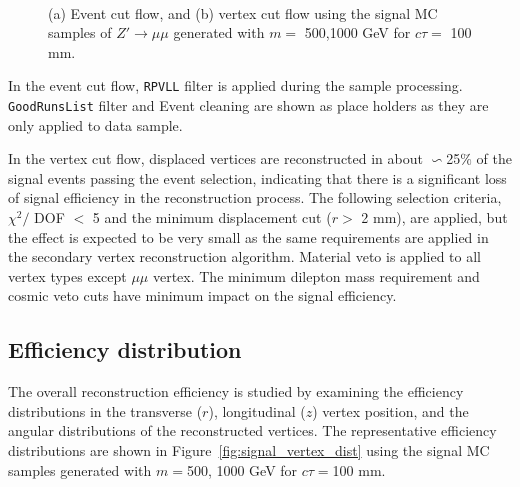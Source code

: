 \begin{figure}[!htb]
    \centering
     \\
    \caption{(a) Event cut flow, and (b) vertex cut flow using the signal MC samples of $Z'\rightarrow \mu\mu$ generated with $m =$ 500,1000 GeV for $c\tau= $ 100 mm.}
    \label{fig:signal_cutflow_MC_mumu}
\end{figure}

In the event cut flow, \texttt{RPVLL} filter is applied during the sample processing. \texttt{GoodRunsList} filter and Event cleaning are shown as place holders as they are only applied to data sample.

In the vertex cut flow, displaced vertices are reconstructed in about $\backsim$25$\%$ of the signal events passing the event selection, indicating that there is a significant loss of signal efficiency in the reconstruction process. The following selection criteria, $\chi^{2} /$ DOF $<$ 5 and the minimum displacement cut ($r > $ 2 mm), are applied, but the effect is expected to be very small as the same requirements are applied in the secondary vertex reconstruction algorithm. Material veto is applied to all vertex types except $\mu\mu$ vertex. The minimum dilepton mass requirement and cosmic veto cuts have minimum impact on the signal efficiency.

\subsection{Efficiency distribution}
\label{sec:signal_vertex_distribution}
The overall reconstruction efficiency is studied by examining the efficiency distributions in the transverse ($r$), longitudinal ($z$) vertex position, and the angular distributions of the reconstructed vertices. The representative efficiency distributions are shown in Figure~\ref{fig:signal_vertex_dist} using the signal MC samples generated with $m =$500, 1000 GeV for $c\tau=$100 mm.

